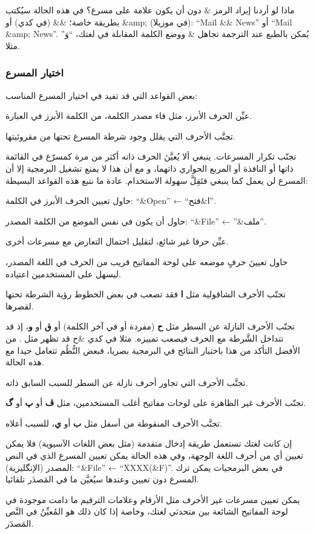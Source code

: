 ماذا لو أردنا إيراد الرمز \& دون أن يكون علامة على مسرع؟ في هذه الحالة
سيُكتب بطريقة خاصة؛ \&\& (في كدي) أو ‪\&amp;‬ (في موزيلا): “Mail \&\&
News” أو “Mail \&amp; News”. يُمكن بالطبع عند الترجمة تجاهل \& ووضع
الكلمة المقابلة في لغتك، “وَ” مثلا.

\subsubsection{اختيار المسرع}
بعض القواعد التي قد تفيد في اختيار المسرع المناسب:

\startitemize[n]
\item عيِّن الحرف الأبرز، مثل فاء مصدر الكلمة، من الكلمة الأبرز في
العبارة.
\item تجنَّب الأحرف التي يقلل وجود شرطة المسرع تحتها من مقروئيتها.
\item تجنّب تكرار المسرعات. ينبغي ألا يُعيَّنَ الحرف ذاته أكثر من مرة
كمسرّع في القائمة ذاتها أو النافذة أو المربع الحواري ذاتهما، و مع أن
هذا لا يمنع تشغيل البرمجية إلا أن المسرع لن يعمل كما ينبغي فتَقِلَّ
سهولة الاستخدام.
\stopitemize
عادة ما نتبع هذه القواعد البسيطة:

\startitemize[n]
\item حاول تعيين الحرف الأبرز في الكلمة: ‪“\&Open”‬ ← “ا\&فتح”.
\item حاول أن يكون في نفس الموضع من الكلمة المصدر: ‪“\&File”‬ ← ”\&ملف”.
\item عيِّن حرفا غير شائع، لتقليل احتمال التعارض مع مسرعات أخرى.
\item حاول تعيينَ حرفٍ موضعه على لوحة المفاتيح قريب من الحرف في اللغة
المصدر، ليسهل على المستخدمين اعتياده.
\item تجنّب الأحرف الشاقولية مثل {\bf ا} فقد تصعب في بعض الخطوط رؤية
الشرطة تحتها لقصرها.
\item تجنّب الأحرف النازلة عن السطر مثل {\bf ح} (مفردة أو في آخر الكلمة)
أو {\bf ق} أو {\bf و}، إذ قد تتداخل الشَّرطة مع الحرف فيصعب تمييزه.
مثلا في كدي \&ح قد تظهر مثل . من الأفضل التأكد من هذا
باختبار النتائج في البرمجية بصريا، فبعض النُّظُم تتعامل جيدا مع هذه
الحالة.
\item تجنَّب الأحرف التي تجاور أحرف نازلة عن السطر للسبب السابق ذاته.
\item تجنّب الأحرف غير الظاهرة على لوحات مفاتيح أغلب المستخدمين، مثل
{\bf ڤ} أو {\bf پ} أو {\bf گ}.
\item تجنَّب الأحرف المنقوطة من أسفل مثل {\bf ب} أو {\bf ي}، للسبب
أعلاه.
\item إن كانت لغتك تستعمل طريقة إدخال متقدمة (مثل بعض اللغات الآسيوية)
فلا يمكن تعيين أي من أحرف اللغة الوجهة، وفي هذه الحالة يمكن تعيين
المسرع الذي في النص المصدر (الإنگليزية): ‪“\&File”‬ ←‏ ‪“XXXX(\&F)”‬.
في بعض البرمجيات يمكن ترك المسرع دون تعيين وعندها سيُعيَّن ما في
المَصدَر تلقائيا.
\item يمكن تعيين مسرعات غير الأحرف مثل الأرقام وعلامات الترقيم ما دامت
موجودة في لوحة المفاتيح الشائعة بين متحدثي لغتك، وخاصة إذا كان ذلك هو
المُعيِّنُ في النَّص المَصدَر.
\stopitemize
